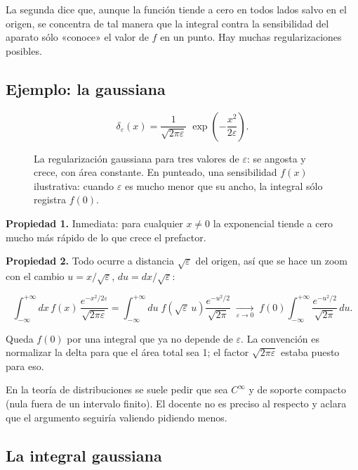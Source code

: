 \documentclass[12pt,a4paper]{article}
\begin{document}
La segunda dice que, aunque la función tiende a cero en todos lados salvo en el
origen, se concentra de tal manera que la integral contra la sensibilidad del
aparato sólo «conoce» el valor de $f$ en un punto. Hay muchas regularizaciones
posibles.

\subsection{Ejemplo: la gaussiana}

\[
\delta_\varepsilon(x) = \frac{1}{\sqrt{2\pi\varepsilon}}\;
\exp\!\left(-\frac{x^2}{2\varepsilon}\right).
\]

\begin{figure}[H]
  \centering
  
  \caption{La regularización gaussiana para tres valores de $\varepsilon$: se angosta y crece, con área constante. En punteado, una sensibilidad $f(x)$ ilustrativa: cuando $\varepsilon$ es mucho menor que su ancho, la integral sólo registra $f(0)$.}
\end{figure}

\textbf{Propiedad 1.} Inmediata: para cualquier $x\neq0$ la exponencial tiende a
cero mucho más rápido de lo que crece el prefactor.

\textbf{Propiedad 2.} Todo ocurre a distancia $\sqrt\varepsilon$ del origen, así
que se hace un zoom con el cambio $u = x/\sqrt\varepsilon$,
$du = dx/\sqrt\varepsilon$:

\[
\int_{-\infty}^{+\infty} dx\,f(x)\,
\frac{e^{-x^2/2\varepsilon}}{\sqrt{2\pi\varepsilon}}
= \int_{-\infty}^{+\infty} du\;f\!\left(\sqrt\varepsilon\,u\right)
\frac{e^{-u^2/2}}{\sqrt{2\pi}}
\;\xrightarrow[\varepsilon\to0]{}\;
f(0)\int_{-\infty}^{+\infty}\frac{e^{-u^2/2}}{\sqrt{2\pi}}\,du .
\]

Queda $f(0)$ por una integral que ya no depende de $\varepsilon$. La convención
es normalizar la delta para que el área total sea 1; el factor
$\sqrt{2\pi\varepsilon}$ estaba puesto para eso.

\begin{notebox}
En la teoría de distribuciones se suele pedir que
sea $C^\infty$ y de soporte compacto (nula fuera de un intervalo finito). El
docente no es preciso al respecto y aclara que el argumento seguiría valiendo
pidiendo menos.
\end{notebox}

\subsection{La integral gaussiana}
\end{document}
